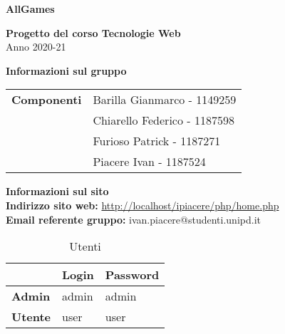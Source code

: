\begin{center}
	\textbf{\Huge{AllGames}}\\
	\vspace{15pt}
\end{center}

\vspace{1.5cm}

\begin{center}
	\textbf{\huge{Progetto del corso Tecnologie Web}}\\[0.2cm]
	\Large{Anno 2020-21}
\end{center}

\vspace{5pt}

\begin{center}
	\textbf{\Large{Informazioni sul gruppo}}
\begin{table}[H]
	\hspace{3.5cm}
	\renewcommand{\arraystretch}{1.4}
	\begin{tabular}{l | l}
		\textbf{Componenti} & Barilla Gianmarco - 1149259\\
		& Chiarello Federico - 1187598\\
		& Furioso Patrick - 1187271\\
		& Piacere Ivan - 1187524\\
	\end{tabular}
\end{table}
\end{center}

\hspace{5pt}

\begin{center}
	\textbf{\Large{Informazioni sul sito}}\\
	\textbf{Indirizzo sito web:} \url{http://localhost/ipiacere/php/home.php}\\
	\textbf{Email referente gruppo:} ivan.piacere@studenti.unipd.it

	\renewcommand{\arraystretch}{1.8}
	\begin{longtable}[H]{| p{.18\hsize} | p{.18\hsize} | p{.18\hsize} |}
		\caption{Utenti}\\
		\rowcolor[HTML]{C14638}
	\multicolumn{1}{c}{\color[HTML]{FFFFFF} \textbf{Utente}} &
		\multicolumn{1}{c}{\color[HTML]{FFFFFF} \textbf{Login}} &
		\multicolumn{1}{c}{\color[HTML]{FFFFFF} \textbf{Password}} \\
		\endhead
		
		\textbf{Admin} & admin & admin\\
		\hline
		\textbf{Utente} & user & user\\
		\hline
	\end{longtable}
\end{center}




